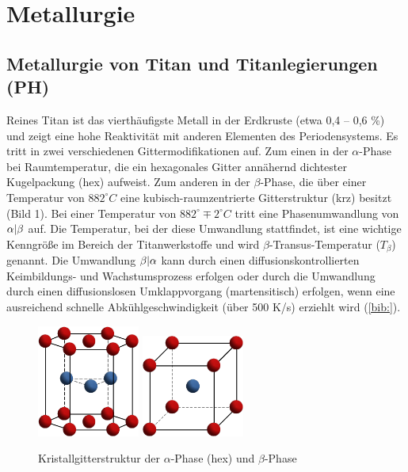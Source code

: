 \chapter{Metallurgie}	


\section{Metallurgie von Titan und Titanlegierungen (PH)}
Reines Titan ist das vierthäufigste Metall in der Erdkruste (etwa 0,4 -- 0,6 \%) und zeigt eine hohe Reaktivität mit anderen Elementen des Periodensystems. Es tritt in zwei verschiedenen Gittermodifikationen auf. Zum einen in der $\alpha$-Phase bei Raumtemperatur, die ein hexagonales Gitter annähernd dichtester Kugelpackung (hex) aufweist. Zum anderen in der $\beta$-Phase, die über einer Temperatur von $882 ^\circ C$ eine kubisch-raumzentrierte Gitterstruktur (krz) besitzt (Bild 1). Bei einer Temperatur von $882^\circ \mp 2 ^\circ C$ tritt eine Phasenumwandlung von $\alpha \arrowvert \beta$ auf. Die Temperatur, bei der diese Umwandlung stattfindet, ist eine wichtige Kenngröße im Bereich der Titanwerkstoffe und wird $\beta$-Transus-Temperatur ($T_{\beta}$) genannt.
Die Umwandlung $\beta \arrowvert \alpha$ kann durch einen diffusionskontrollierten Keimbildungs- und Wachstumsprozess erfolgen oder durch die Umwandlung durch einen diffusionslosen Umklappvorgang (martensitisch) erfolgen, wenn eine ausreichend schnelle Abkühlgeschwindigkeit (über 500 K/s) erziehlt wird (\ref{bib:}).

\begin{figure}[h]
	\centering
	\subfloat{}
	\includegraphics[width=0.3\textwidth]{Bilder/hcp}
	\hspace{4ex}
	\subfloat{}
	\includegraphics[width=0.3\textwidth]{Bilder/krz}
	\caption{Kristallgitterstruktur der $\alpha$-Phase (hex) und $\beta$-Phase}
	\label{fig:Kristallgitter}
\end{figure}


